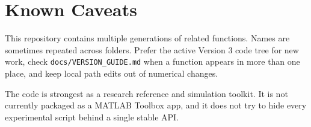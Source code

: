 \documentclass[11pt,oneside]{report}
\newcommand{\code}[1]{\texttt{#1}}
\begin{document}
\chapter{Known Caveats}

This repository contains multiple generations of related functions. Names are
sometimes repeated across folders. Prefer the active Version 3 code tree for new
work, check \code{docs/VERSION\_GUIDE.md} when a function appears in more than
one place, and keep local path edits out of numerical changes.

The code is strongest as a research reference and simulation toolkit. It is not
currently packaged as a MATLAB Toolbox app, and it does not try to hide every
experimental script behind a single stable API.
\end{document}
